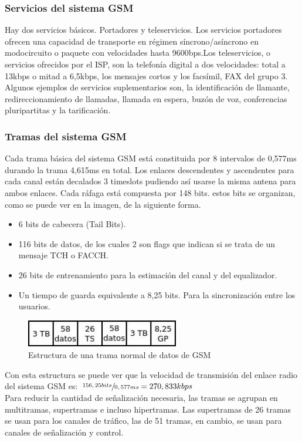 \subsubsection{Servicios del sistema \acrshort{GSM}}
\label{ssub:serviciosGSM}
Hay dos servicios básicos. Portadores y teleservicios. Los servicios portadores ofrecen una capacidad de transporte en régimen síncrono/asíncrono en modocircuito o paquete con velocidades hasta 9600bps.Los teleservicios, o servicios ofrecidos por el \acrshort{ISP}, son la telefonía digital a dos velocidades: total a 13kbps o mitad a 6,5kbps, los mensajes cortos y los facsímil, FAX del grupo 3. Algunos ejemplos de servicios suplementarios son, la identificación de llamante, redireccionamiento de llamadas, llamada en espera, buzón de voz, conferencias pluripartitas y la tarificación.
\subsubsection{Tramas del sistema \acrshort{GSM}}
\label{ssub:tramaGSM}
Cada trama básica del sistema \acrshort{GSM} está constituida por 8 intervalos de 0,577ms durando la trama 4,615ms en total. Los enlaces descendentes y ascendentes para cada canal están decalados 3 timeslots pudiendo así usarse la misma antena para ambos enlaces. Cada ráfaga está compuesta por 148 bits. estos bits se organizan, como se puede ver en la imagen, de la siguiente forma.
\begin{itemize}
	\item 6 bits de cabecera (Tail Bits).
	\item 116 bits de datos, de los cuales 2 son flags que indican si se trata de un mensaje TCH o \acrshort{FACCH}.
	\item 26 bits de entrenamiento para la estimación del canal y del equalizador.
	\item Un tiempo de guarda equivalente a 8,25 bits. Para la sincronización entre los usuarios.
\end{itemize} 
\begin{figure}[H]
\centering
\includegraphics[width=0.6\textwidth]{Imagen/tramaGSM.jpg}
\caption{Estructura de una trama normal de datos de \acrshort{GSM}}
\label{img:tramaGSM}
\end{figure}
Con esta estructura se puede ver que la velocidad de transmisión del enlace radio del sistema \acrshort{GSM} es: $\sfrac{156,25bits}{0,577ms}=270,833kbps$\\
Para reducir la cantidad de señalización necesaria, las tramas se agrupan en multitramas, supertramas e incluso hipertramas. Las supertramas de 26 tramas se usan para los canales de tráfico, las de 51 tramas, en cambio, se usan para canales de señalización y control.
